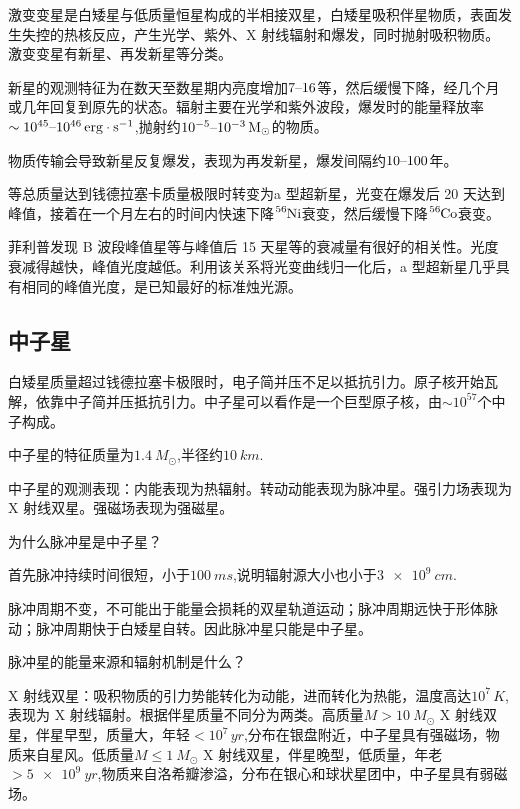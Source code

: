 \documentclass[../天体物理基础.tex]{subfiles}
\begin{document}
激变变星是白矮星与低质量恒星构成的半相接双星，白矮星吸积伴星物质，表面发生失控的热核反应，产生光学、紫外、X 射线辐射和爆发，同时抛射吸积物质。激变变星有新星、再发新星等分类。

新星的观测特征为在数天至数星期内亮度增加$7\text{\textendash}16$等，然后缓慢下降，经几个月或几年回复到原先的状态。辐射主要在光学和紫外波段，爆发时的能量释放率$\sim10^{45}\text{\textendash}10^{46}\,\unit{erg\cdot{}s^{-1}}$,抛射约$10^{-5}\text{\textendash}10^{-3}\,\unit{M_{\odot}}$的物质。

物质传输会导致新星反复爆发，表现为再发新星，爆发间隔约$10\text{\textendash}100$年。

等总质量达到钱德拉塞卡质量极限时转变为\uppercase\expandafter{}a 型超新星，光变在爆发后 20 天达到峰值，接着在一个月左右的时间内快速下降$\ce{^{56}Ni}$衰变，然后缓慢下降$\ce{^{56}Co}$衰变。

菲利普发现 B 波段峰值星等与峰值后 15 天星等的衰减量有很好的相关性。光度衰减得越快，峰值光度越低。利用该关系将光变曲线归一化后，\uppercase\expandafter{}a 型超新星几乎具有相同的峰值光度，是已知最好的标准烛光源。

\subsection{中子星}

白矮星质量超过钱德拉塞卡极限时，电子简并压不足以抵抗引力。原子核开始瓦解，依靠中子简并压抵抗引力。中子星可以看作是一个巨型原子核，由$\sim10^{57}$个中子构成。

中子星的特征质量为$\qty{1.4}{M_{\odot}}$,半径约$\qty{10}{km}$.

中子星的观测表现：内能表现为热辐射。转动动能表现为脉冲星。强引力场表现为 X 射线双星。强磁场表现为强磁星。

为什么脉冲星是中子星？

首先脉冲持续时间很短，小于$\qty{100}{ms}$,说明辐射源大小也小于$\qty{3e9}{cm}$.

脉冲周期不变，不可能出于能量会损耗的双星轨道运动；脉冲周期远快于形体脉动；脉冲周期快于白矮星自转。因此脉冲星只能是中子星。

脉冲星的能量来源和辐射机制是什么？


X 射线双星：吸积物质的引力势能转化为动能，进而转化为热能，温度高达$10^{7}\,\unit{K}$,表现为 X 射线辐射。根据伴星质量不同分为两类。高质量$M>\qty{10}{M_{\odot}}$ X 射线双星，伴星早型，质量大，年轻$<10^{7}\,\unit{yr}$,分布在银盘附近，中子星具有强磁场，物质来自星风。低质量$M\le\qty{1}{M_{\odot}}$ X 射线双星，伴星晚型，低质量，年老$>\qty{5e9}{yr}$,物质来自洛希瓣渗溢，分布在银心和球状星团中，中子星具有弱磁场。
\end{document}
